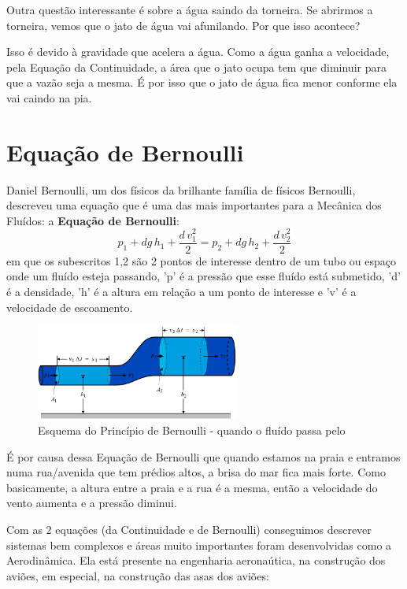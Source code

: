 \documentclass[12pt]{extarticle}
\newcommand{\<}{\langle}
\renewcommand{\>}{\rangle}
\theoremstyle{definition}
\begin{document}
Outra questão interessante é sobre a água saindo da torneira. Se abrirmos a torneira, vemos que o jato de água vai afunilando. Por que isso acontece?

Isso é devido à gravidade que acelera a água. Como a água ganha a velocidade, pela Equação da Continuidade, a área que o jato ocupa tem que diminuir para que a vazão seja a mesma. É por isso que o jato de água fica menor conforme ela vai caindo na pia.

\section{Equação de Bernoulli}
Daniel Bernoulli, um dos físicos da brilhante família de físicos Bernoulli, descreveu uma equação que é uma das mais importantes para a Mecânica dos Fluídos: a \textbf{Equação de Bernoulli}:
\begin{equation}
    p_1 + dg\,h_1 + \frac{d\,v_1^2}{2} = p_2 + dg\,h_2 + \frac{d\,v_2^2}{2}
\end{equation}
\noindent em que os subescritos 1,2 são 2 pontos de interesse dentro de um tubo ou espaço onde um fluído esteja passando, 'p' é a pressão que esse fluído está submetido, 'd' é a densidade, 'h' é a altura em relação a um ponto de interesse e 'v' é a velocidade de escoamento.
\begin{figure}[H]
    \centering
    \includegraphics[width=0.6\textwidth]{principio_bernoulli.png}
    \caption{Esquema do Princípio de Bernoulli - quando o fluído passa pelo}
    \label{fig:Bernoulli}
\end{figure}

É por causa dessa Equação de Bernoulli que quando estamos na praia e entramos numa rua/avenida que tem prédios altos, a brisa do mar fica mais forte. Como basicamente, a altura entre a praia e a rua é a mesma, então a velocidade do vento aumenta e a pressão diminui.

Com as 2 equações (da Continuidade e de Bernoulli) conseguimos descrever sistemas bem complexos e áreas muito importantes foram desenvolvidas como a Aerodinâmica. Ela está presente na engenharia aeronaútica, na construção dos aviões, em especial, na construção das asas dos aviões:
\end{document}
